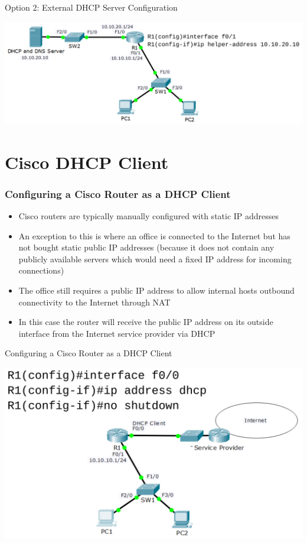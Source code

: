 \documentclass[pdflatex,compress,mathserif]{beamer}
\begin{document}
\begin{frame}{Option 2: External DHCP Server Configuration}
	\begin{center}
		\includegraphics[width=\linewidth]{img/img09}
	\end{center}
\end{frame}

\section{Cisco DHCP Client}

\begin{frame}
	\frametitle{Configuring a Cisco Router as a DHCP Client}
	\begin{itemize}
		\item Cisco routers are typically manually configured with static IP addresses
		\item An exception to this is where an office is connected to the Internet but
has not bought static public IP addresses (because it does not contain
any publicly available servers which would need a fixed IP address for
incoming connections)
		\item The office still requires a public IP address to allow internal hosts
outbound connectivity to the Internet through NAT
		\item In this case the router will receive the public IP address on its outside
interface from the Internet service provider via DHCP
	\end{itemize}
\end{frame}

\begin{frame}{Configuring a Cisco Router as a DHCP Client}
	\begin{center}
		\includegraphics[width=\linewidth]{img/img10}
	\end{center}
\end{frame}
\end{document}
